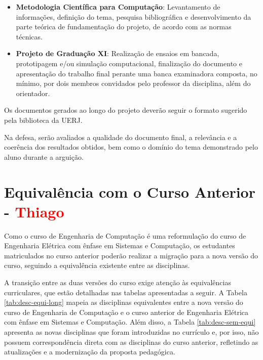 \begin{itemize}
    \item \textbf{Metodologia Científica para Computação}: Levantamento de informações, definição do tema, pesquisa bibliográfica e desenvolvimento da parte teórica de fundamentação do projeto, de acordo com as normas técnicas.
    \item \textbf{Projeto de Graduação XI}: Realização de ensaios em bancada, prototipagem e/ou simulação computacional, finalização do documento e apresentação do trabalho final perante uma banca examinadora composta, no mínimo, por dois membros convidados pelo professor da disciplina, além do orientador.
\end{itemize}

Os documentos gerados ao longo do projeto deverão seguir o formato sugerido pela biblioteca da UERJ.

Na defesa, serão avaliados a qualidade do documento final, a relevância e a coerência dos resultados obtidos, bem como o domínio do tema demonstrado pelo aluno durante a arguição.



\section{Equivalência com o Curso Anterior - \textcolor{red}{Thiago}}

Como o curso de Engenharia de Computação é uma reformulação do curso de Engenharia Elétrica com ênfase em Sistemas e Computação, os estudantes matriculados no curso anterior poderão realizar a migração para a nova versão do curso, seguindo a equivalência existente entre as disciplinas.

A transição entre as duas versões do curso exige atenção às equivalências curriculares, que estão detalhadas nas tabelas apresentadas a seguir. A Tabela \ref{tab:desc-equi-long}  mapeia as disciplinas equivalentes entre a nova versão do curso de Engenharia de Computação e o curso anterior de Engenharia Elétrica com ênfase em Sistemas e Computação. Além disso, a Tabela \ref{tab:desc-sem-equi} apresenta as novas disciplinas que foram introduzidas no currículo e, por isso, não possuem correspondência direta com as disciplinas do curso anterior, refletindo as atualizações e a modernização da proposta pedagógica.

